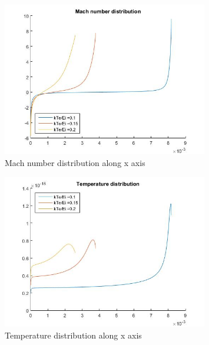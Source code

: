 \begin{figure}[h!]
	\centering
	\includegraphics[width=0.8\textwidth]{img/Mach.jpg}
	\caption{Mach number distribution along x axis}
	\label{fig:mach}
\end{figure}

\begin{figure}[h!]
	\centering
	\includegraphics[width=0.8\textwidth]{img/Temperature.jpg}
	\caption{Temperature distribution along x axis}
	\label{fig:temp}
\end{figure}
